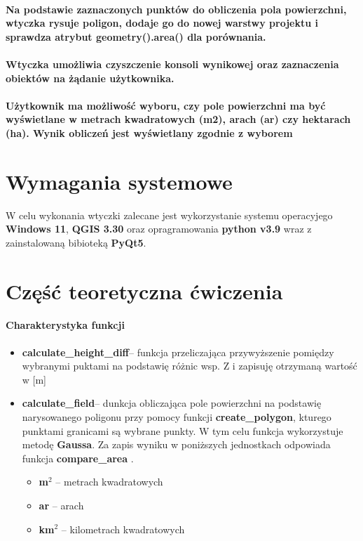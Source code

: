 \documentclass[a4paper,titleauthor]{mwart}
\begin{document}
        \paragraph{Na podstawie zaznaczonych punktów do obliczenia pola powierzchni, wtyczka rysuje poligon, dodaje go do nowej warstwy projektu i sprawdza atrybut geometry().area() dla porównania.}
        \paragraph{Wtyczka umożliwia czyszczenie konsoli wynikowej oraz zaznaczenia obiektów na żądanie użytkownika.}
        \paragraph{Użytkownik ma możliwość wyboru, czy pole powierzchni ma być wyświetlane w metrach kwadratowych (m2), arach (ar) czy hektarach (ha). Wynik obliczeń jest wyświetlany zgodnie z wyborem}

\section{Wymagania systemowe}
W celu wykonania wtyczki zalecane jest wykorzystanie systemu operacyjego \textbf{Windows 11}, \textbf{QGIS 3.30} oraz opragramowania \textbf{python v3.9} wraz z zainstalowaną bibioteką \textbf{PyQt5}.

\section{Część teoretyczna ćwiczenia}
    \paragraph{Charakterystyka funkcji}
    \begin{itemize}
        \item \textbf{calculate\_height\_diff}-- funkcja przeliczająca przywyższenie pomiędzy wybranymi puktami na podstawię różnic wsp. Z i zapisuję otrzymaną wartość w [m]
        \item \textbf{calculate\_field}-- dunkcja obliczająca pole powierzchni na podstawię narysowanego poligonu przy pomocy funkcji \textbf{create\_polygon}, kturego punktami granicami są wybrane punkty. W tym celu funkcja wykorzystuje metodę \textbf{Gaussa}. Za zapis wyniku w poniższych jednostkach odpowiada funkcja \textbf{compare\_area} .
        \begin{itemize}
            \item \textbf{m$^2$} -- metrach kwadratowych
            \item  \textbf{ar} -- arach
            \item  \textbf{km$^2$} -- kilometrach kwadratowych
        \end{itemize}
        \begin{flushright}
        \cite{poleGaussa}

    \end{flushright}
    \end{itemize}
\end{document}
